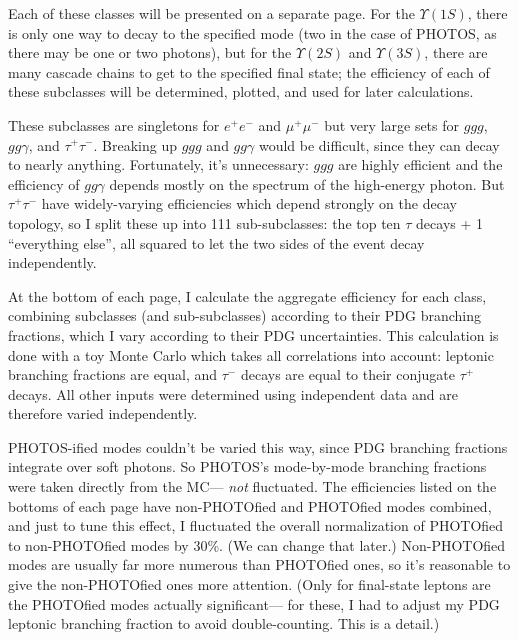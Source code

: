 \documentclass[landscape]{article}
\begin{document}
\vspace{0.2 cm} \hspace{0.2 cm} Each of these classes will be presented on a separate page.  For the
$\Upsilon(1S)$, there is only one way to decay to the specified mode
(two in the case of PHOTOS, as there may be one or two photons), but
for the $\Upsilon(2S)$ and $\Upsilon(3S)$, there are many cascade
chains to get to the specified final state; the efficiency of each of
these subclasses will be determined, plotted, and used for later
calculations.

\vspace{1.4 cm} \hspace{0.2 cm} These subclasses are singletons for $e^+e^-$ and $\mu^+\mu^-$ but very
large sets for $ggg$, $gg\gamma$, and $\tau^+\tau^-$.  Breaking up
$ggg$ and $gg\gamma$ would be difficult, since they can decay to
nearly anything.  Fortunately, it's unnecessary: $ggg$ are highly
efficient and the efficiency of $gg\gamma$ depends mostly on the
spectrum of the high-energy photon.  But $\tau^+\tau^-$ have
widely-varying efficiencies which depend strongly on the decay
topology, so I split these up into 111 sub-subclasses: the top ten
$\tau$ decays + 1 ``everything else'', all squared to let the two
sides of the event decay independently.

\vspace{1.4 cm} \hspace{0.2 cm} At the bottom of each page, I calculate the aggregate efficiency for
each class, combining subclasses (and sub-subclasses) according to
their PDG branching fractions, which I vary according to their PDG
uncertainties.  This calculation is done with a toy Monte Carlo which
takes all correlations into account: leptonic branching fractions are
equal, and $\tau^-$ decays are equal to their conjugate $\tau^+$
decays.  All other inputs were determined using independent data and
are therefore varied independently.

\vspace{1.4 cm} \hspace{0.2 cm} PHOTOS-ified modes couldn't be varied this way, since PDG branching
fractions integrate over soft photons.  So PHOTOS's mode-by-mode
branching fractions were taken directly from the MC--- {\it not}
fluctuated.  The efficiencies listed on the bottoms of each page have
non-PHOTOfied and PHOTOfied modes combined, and just to tune this
effect, I fluctuated the overall normalization of PHOTOfied to
non-PHOTOfied modes by 30\%.  (We can change that later.)
Non-PHOTOfied modes are usually far more numerous than PHOTOfied ones,
so it's reasonable to give the non-PHOTOfied ones more attention.
(Only for final-state leptons are the PHOTOfied modes actually
significant--- for these, I had to adjust my PDG leptonic branching
fraction to avoid double-counting.  This is a detail.)
\end{document}
